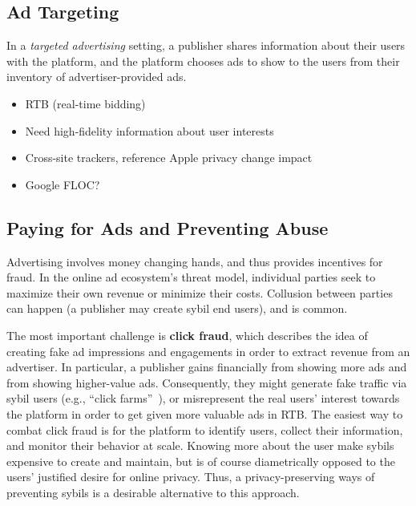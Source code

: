 \subsection{Ad Targeting}

%
In a \emph{targeted advertising} setting, a publisher shares information about
their users with the platform, and the platform chooses ads to show to the
users from their inventory of advertiser-provided ads.
%

\begin{itemize}
  \item RTB (real-time bidding)
  \item Need high-fidelity information about user interests
  \item Cross-site trackers, reference Apple privacy change impact
  \item Google FLOC?
\end{itemize}

\subsection{Paying for Ads and Preventing Abuse}


%
Advertising involves money changing hands, and thus provides incentives for
fraud.
%
In the online ad ecosystem's threat model, individual parties seek to maximize
their own revenue or minimize their costs.
%
Collusion between parties can happen (\eg a publisher may create sybil end
users), and is common.
%

%
The most important challenge is \textbf{click fraud}, which describes the idea
of creating fake ad impressions and engagements in order to extract revenue from
an advertiser.
%
In particular, a publisher gains financially from showing more ads and from
showing higher-value ads.
%
Consequently, they might generate fake traffic via sybil users (e.g., ``click
farms''~\cite{understanding-ad-fraud}), or misrepresent the real users' interest
towards the platform in order to get given more valuable ads in RTB.
%
The easiest way to combat click fraud is for the platform to identify users,
collect their information, and monitor their behavior at scale.
%
Knowing more about the user make sybils expensive to create and maintain, but is
of course diametrically opposed to the users' justified desire for online
privacy.
%
Thus, a privacy-preserving ways of preventing sybils is a desirable alternative to this approach.


